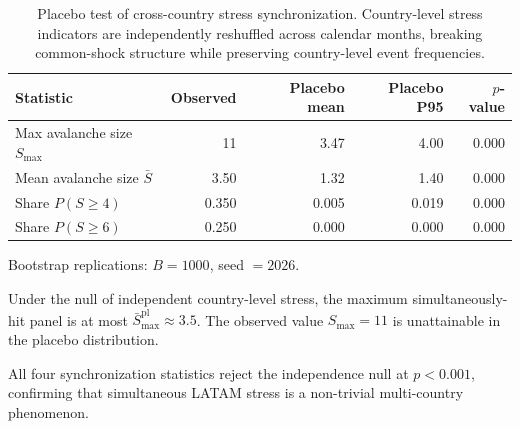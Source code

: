 \begin{table}[!htbp]
\centering
\footnotesize
\begin{threeparttable}
\caption{Placebo test of cross-country stress synchronization. Country-level stress indicators are independently reshuffled across calendar months, breaking common-shock structure while preserving country-level event frequencies.}
\label{tab:placebo}
\begin{tabular}{lrrrr}
\toprule
Statistic & Observed & Placebo mean & Placebo P95 & $p$-value \\
\midrule
Max avalanche size $S_{\max}$ & 11 & 3.47 & 4.00 & 0.000 \\
Mean avalanche size $\bar{S}$ & 3.50 & 1.32 & 1.40 & 0.000 \\
Share $P(S\geq 4)$ & 0.350 & 0.005 & 0.019 & 0.000 \\
Share $P(S\geq 6)$ & 0.250 & 0.000 & 0.000 & 0.000 \\
\bottomrule
\end{tabular}
\begin{tablenotes}\footnotesize
\item Bootstrap replications: $B=1000$, seed $=2026$.
\item Under the null of independent country-level stress, the maximum simultaneously-hit panel is at most $\bar{S}_{\max}^{\mathrm{pl}}\approx 3.5$. The observed value $S_{\max}=11$ is unattainable in the placebo distribution.
\item All four synchronization statistics reject the independence null at $p<0.001$, confirming that simultaneous LATAM stress is a non-trivial multi-country phenomenon.
\end{tablenotes}
\end{threeparttable}
\end{table}

